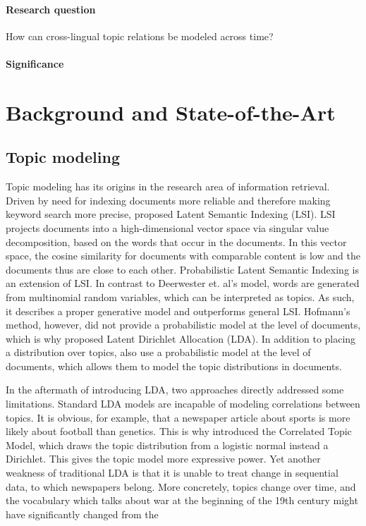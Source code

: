 \paragraph{Research question}
How can cross-lingual topic relations be modeled across time?

\paragraph{Significance}

\section{Background and State-of-the-Art}

\subsection{Topic modeling}
Topic modeling has its origins in the research area of information retrieval. Driven by need for indexing documents more reliable and therefore making keyword search more precise, \citet{deerwesterscottindexing1990} proposed Latent Semantic Indexing (LSI). LSI projects documents into a high-dimensional vector space via singular value decomposition, based on the words that occur in the documents. In this vector space, the cosine similarity for documents with comparable content is low and the documents thus are close to each other. Probabilistic Latent Semantic Indexing \citep{hofmannprobabilistic1999} is an extension of LSI. In contrast to Deerwester et. al's model, words are generated from multinomial random variables, which can be interpreted as topics. As such, it describes a proper generative model and outperforms general LSI. Hofmann's method, however, did not provide a probabilistic model at the level of documents, which is why  \citet{bleilatent2003} proposed Latent Dirichlet Allocation (LDA). In addition to placing a distribution over topics, \citet{bleilatent2003} also use a probabilistic model at the level of documents, which allows them to model the topic distributions in documents.

In the aftermath of introducing LDA, two approaches directly addressed some limitations. Standard LDA models are incapable of modeling correlations between topics. It is obvious, for example, that a newspaper article about sports is more likely about football than genetics. This is why \citet{Blei:2005:CTM:2976248.2976267} introduced the Correlated Topic Model, which draws the topic distribution from a logistic normal instead a Dirichlet. This gives the topic model more expressive power. Yet another weakness of traditional LDA is that it is unable to treat change in sequential data, to which newspapers belong. More concretely, topics change over time, and the vocabulary which talks about war at the beginning of the 19th century might have significantly changed from the 

